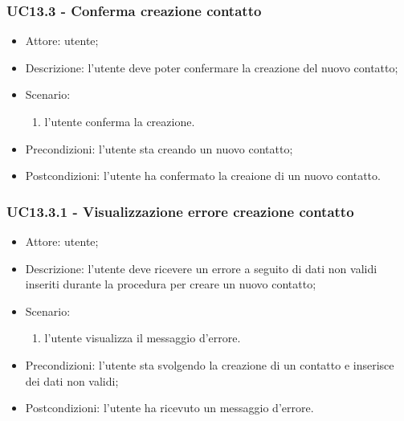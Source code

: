 \subsubsection{UC13.3 - Conferma creazione contatto} \label{sec: UC13.3}
\begin{itemize}
    \item Attore: utente;
    \item Descrizione: l'utente deve poter confermare la creazione del nuovo contatto;
    \item Scenario:
        \begin{enumerate}
        \item l'utente conferma la creazione.
        \end{enumerate}
    
    \item Precondizioni: l'utente sta creando un nuovo contatto;
    \item Postcondizioni: l'utente ha confermato la creaione di un nuovo contatto.
\end{itemize}


\subsubsection{UC13.3.1 - Visualizzazione errore creazione contatto} \label{sec: UC13.3.1}
\begin{itemize}
    \item Attore: utente;
    \item Descrizione: l'utente deve ricevere un errore a seguito di dati non validi inseriti durante la procedura per creare un nuovo contatto;
    \item Scenario:
        \begin{enumerate}
        \item l'utente visualizza il messaggio d'errore.
        \end{enumerate}
    
    \item Precondizioni: l'utente sta svolgendo la creazione di un contatto e inserisce dei dati non validi;
    \item Postcondizioni: l'utente ha ricevuto un messaggio d'errore.
\end{itemize}